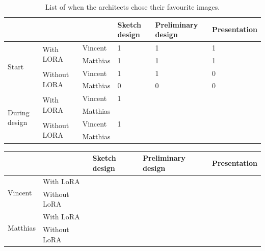 \subsubsection{}
\begin{table}[h]
\centering
\begin{tabular}{|l|l|l|l|l|l|}

\hline
 & & & Sketch design & Preliminary design & Presentation \\
 \hline

\multirow{4}{}{Start} & \multirow{2}{}{With LORA} & Vincent & 1 & 1 & 1 \\ 

\cline{3-6}
& & Matthias & 1 & 1 & 1 \\

\cline{2-6}
& \multirow{2}{*}{Without LORA} & Vincent & 1 & 1 & 0 \\ 

\cline{3-6}
& & Matthias & 0 & 0 & 0\\ 

\hline
\hline

\multirow{4}{*}{During design} 
  & \multirow{2}{*}{With LORA} 
      & Vincent & 1 & & \\ \cline{3-6}
  &                                  
      & Matthias & & & \\ \cline{2-6}
  & \multirow{2}{*}{Without LORA} 
      & Vincent & 1 & & \\ \cline{3-6}
  &                                  
      & Matthias & & & \\ \hline
\end{tabular}
\caption{List of when the architects chose their favourite images.}
\label{tab:design-phases}
\end{table}

\begin{table}[h]
\centering
\begin{tabular}{|l|l|l|l|l|}

\hline
& & Sketch design & Preliminary design & Presentation \\
\hline

\multirow{2}{*}{Vincent} & With LoRA & & & \\
\cline{2-5}
& Without LoRA & & & \\
\hline
\multirow{2}{*}{Matthias} & With LoRA & & & \\
\cline{2-5}
& Without LoRA & & & \\
\hline
\end{tabular}
\end{table}

